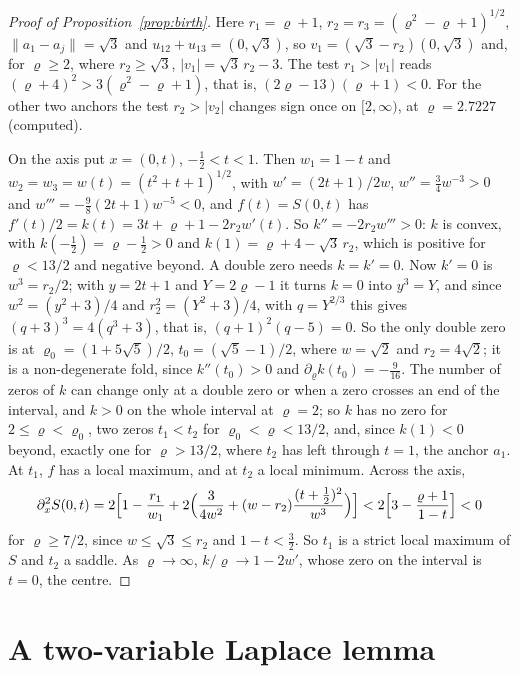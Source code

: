 \begin{proof}[Proof of Proposition~\ref{prop:birth}]
Here $r_1 = \varrho + 1$, $r_2 = r_3 = (\varrho^2 - \varrho + 1)^{1/2}$, $\|a_1 - a_j\| = \sqrt3$ and $u_{12} + u_{13} = (0, \sqrt3)$,
so $v_1 = (\sqrt3 - r_2)(0, \sqrt3)$ and, for $\varrho \ge 2$, where $r_2 \ge \sqrt3$, $|v_1| = \sqrt3\,r_2 - 3$. The test
$r_1 > |v_1|$ reads $(\varrho + 4)^2 > 3(\varrho^2 - \varrho + 1)$, that is, $(2\varrho - 13)(\varrho + 1) < 0$. For the other two
anchors the test $r_2 > |v_2|$ changes sign once on $[2, \infty)$, at $\varrho = 2.7227$ (computed).

On the axis put $x = (0, t)$, $-\frac12 < t < 1$. Then $w_1 = 1 - t$ and $w_2 = w_3 = w(t) = (t^2 + t + 1)^{1/2}$, with
$w' = (2t + 1)/2w$, $w'' = \frac34 w^{-3} > 0$ and $w''' = -\frac98(2t + 1)w^{-5} < 0$, and $f(t) = S(0, t)$ has
$f'(t)/2 = k(t) = 3t + \varrho + 1 - 2r_2w'(t)$. So $k'' = -2r_2w''' > 0$: $k$ is convex, with $k(-\frac12) = \varrho - \frac12 > 0$
and $k(1) = \varrho + 4 - \sqrt3\,r_2$, which is positive for $\varrho < 13/2$ and negative beyond. A double zero needs
$k = k' = 0$. Now $k' = 0$ is $w^3 = r_2/2$; with $y = 2t + 1$ and $Y = 2\varrho - 1$ it turns $k = 0$ into $y^3 = Y$, and since
$w^2 = (y^2 + 3)/4$ and $r_2^2 = (Y^2 + 3)/4$, with $q = Y^{2/3}$ this gives $(q + 3)^3 = 4(q^3 + 3)$, that is,
$(q + 1)^2(q - 5) = 0$. So the only double zero is at $\varrho_0 = (1 + 5\sqrt5)/2$, $t_0 = (\sqrt5 - 1)/2$, where $w = \sqrt2$
and $r_2 = 4\sqrt2$; it is a non-degenerate fold, since $k''(t_0) > 0$ and $\partial_\varrho k(t_0) = -\frac9{16}$. The number of
zeros of $k$ can change only at a double zero or when a zero crosses an end of the interval, and $k > 0$ on the whole
interval at $\varrho = 2$; so $k$ has no zero for $2 \le \varrho < \varrho_0$, two zeros $t_1 < t_2$ for $\varrho_0 < \varrho < 13/2$, and,
since $k(1) < 0$ beyond, exactly one for $\varrho > 13/2$, where $t_2$ has left through $t = 1$, the anchor $a_1$. At $t_1$,
$f$ has a local maximum, and at $t_2$ a local minimum. Across the axis,
\[ \partial_x^2S(0, t) = 2\Bigl[1 - \frac{r_1}{w_1} + 2\Bigl(\frac{3}{4w^2} + (w - r_2)\frac{(t + \frac12)^2}{w^3}\Bigr)\Bigr]
   < 2\Bigl[3 - \frac{\varrho + 1}{1 - t}\Bigr] < 0 \]
for $\varrho \ge 7/2$, since $w \le \sqrt3 \le r_2$ and $1 - t < \frac32$. So $t_1$ is a strict local maximum of $S$ and $t_2$ a
saddle. As $\varrho \to \infty$, $k/\varrho \to 1 - 2w'$, whose zero on the interval is $t = 0$, the centre.
\end{proof}

\section{A two-variable Laplace lemma}\label{app:laplace2}

